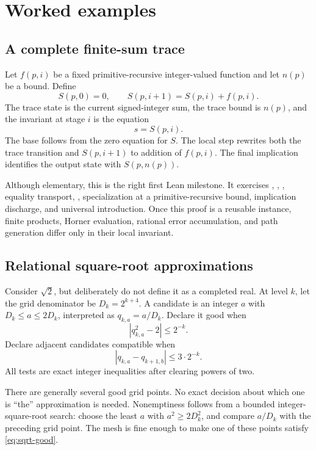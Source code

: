 \section{Worked examples}
\label{sec:worked-examples}

\subsection{A complete finite-sum trace}

Let \(f(p,i)\) be a fixed primitive-recursive integer-valued function and let
\(n(p)\) be a bound.  Define
\[
 S(p,0)=0,
 \qquad
 S(p,i+1)=S(p,i)+f(p,i).
\]
The trace state is the current signed-integer sum, the trace bound is \(n(p)\),
and the invariant at stage \(i\) is the equation
\[
 s=S(p,i).
\]
The base follows from the zero equation for \(S\).  The local step rewrites
both the trace transition and \(S(p,i+1)\) to addition of \(f(p,i)\).  The
final implication identifies the output state with \(S(p,n(p))\).

Although elementary, this is the right first Lean milestone.  It exercises
, , , equality transport,
, specialization at a primitive-recursive bound, implication
discharge, and universal introduction.  Once this proof is a reusable
 instance, finite products, Horner evaluation, rational
error accumulation, and path generation differ only in their local invariant.

\subsection{Relational square-root approximations}

Consider \(\sqrt2\), but deliberately do not define it as a completed real.
At level \(k\), let the grid denominator be
\(D_k=2^{k+4}\).  A candidate is an integer
\(a\) with \(D_k\le a\le2D_k\), interpreted as
\(q_{k,a}=a/D_k\).  Declare it good when
\begin{equation}
 |q_{k,a}^2-2|\le 2^{-k}.
 \label{eq:sqrt-good}
\end{equation}
Declare adjacent candidates compatible when
\begin{equation}
 |q_{k,a}-q_{k+1,b}|\le 3\cdot2^{-k}.
 \label{eq:sqrt-compat}
\end{equation}
All tests are exact integer inequalities after clearing powers of two.

There are generally several good grid points.  No exact decision about which
one is ``the'' approximation is needed.  Nonemptiness follows from a bounded
integer-square-root search: choose the least \(a\) with \(a^2\ge2D_k^2\), and
compare \(a/D_k\) with the preceding grid point.  The mesh is fine enough to
make one of these points satisfy \eqref{eq:sqrt-good}.

